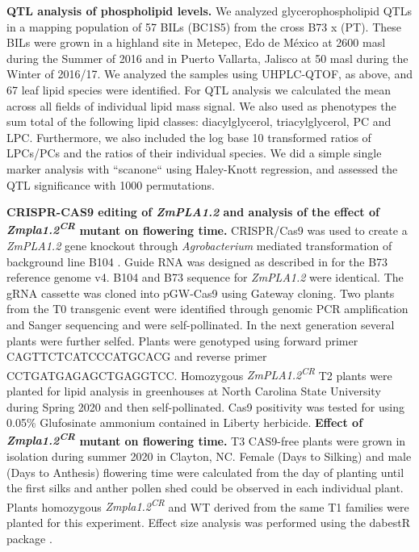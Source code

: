 \documentclass[9pt,twocolumn,twoside,lineno]{BioRxiv}
\begin{document}
\textbf{QTL analysis of phospholipid levels.}
We analyzed glycerophospholipid QTLs in a mapping population of 57 BILs (BC1S5) from the cross B73 x (PT).
These BILs were grown in a highland site in Metepec, Edo de M\'exico at 2600 masl during the Summer of 2016 and in Puerto Vallarta, Jalisco at 50 masl during the Winter of 2016/17.  
We analyzed the samples using UHPLC-QTOF, as above, and 67 leaf lipid species were identified.
For QTL analysis we calculated the mean across all fields of individual lipid mass signal. 
We also used as phenotypes the sum total of the following lipid classes: diacylglycerol, triacylglycerol, PC and  LPC.  
Furthermore,  we also included the log base 10 transformed ratios of LPCs/PCs and the ratios of their individual species. 
We did a simple single marker analysis  with ``scanone`` using Haley-Knott  regression, and assessed the QTL significance with 1000 permutations.

\textbf{CRISPR-CAS9 editing of \textit{ZmPLA1.2} and analysis of the effect of \textit{Zmpla1.2\textsuperscript{CR}} mutant on flowering time.}
CRISPR/Cas9 was used to create a \textit{ZmPLA1.2} gene knockout through \textit{Agrobacterium} mediated transformation of background line B104 \cite{Wu2020-nq, Char2017-uk}. 
Guide RNA was designed as described in \cite{Brazelton2015-co} for the B73 reference genome v4. 
B104 and B73 sequence for \textit{ZmPLA1.2} were identical. 
The gRNA cassette was cloned into pGW-Cas9 using Gateway cloning. 
Two plants from the T0 transgenic event were identified through genomic PCR amplification and Sanger sequencing and were self-pollinated. 
In the next generation several plants were further selfed.
Plants were genotyped using forward primer CAGTTCTCATCCCATGCACG and reverse primer CCTGATGAGAGCTGAGGTCC.
Homozygous \textit{ZmPLA1.2\textsuperscript{CR}} T2 plants were  planted for lipid analysis in greenhouses at  North Carolina State University during Spring 2020 and then self-pollinated. 
Cas9 positivity was tested for using 0.05\% Glufosinate ammonium contained in Liberty herbicide. 
\textbf{Effect of \textit{Zmpla1.2\textsuperscript{CR}} mutant on flowering time.}
T3 CAS9-free plants were grown in isolation during summer 2020 in Clayton, NC. 
Female (Days to Silking) and male (Days to Anthesis) flowering time were calculated from the day of planting until the first silks and anther pollen shed could be observed in each individual plant. 
Plants homozygous \textit{Zmpla1.2\textsuperscript{CR}} and WT derived from the same T1 families were planted for this experiment. 
Effect size analysis was performed using the dabestR package \cite{Ho2019-yl}.
\end{document}
